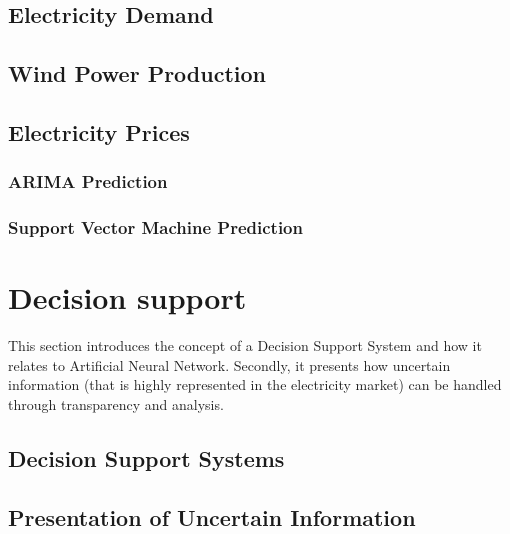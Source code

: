 \documentclass[twoside,11pt,openright]{report}
\begin{document}
\subsection{Electricity Demand}
\label{sec:ElectricityDemand}


\subsection{Wind Power Production}


\subsection{Electricity Prices}
\label{sec:electriciyPrices}


\subsubsection{ARIMA Prediction}
 
\subsubsection{Support Vector Machine Prediction}
\label{sec:svmPrediction}



\newpage

\section{Decision support}
This section introduces the concept of a Decision Support System and how it relates to Artificial Neural Network. Secondly, it presents how uncertain information (that is highly represented in the electricity market) can be handled through transparency and analysis.  
\label{sec:dssAndUncertain}
\subsection{Decision Support Systems}
\label{sec:dssSection}

\subsection{Presentation of Uncertain Information}
\label{sec:uncertainInformation}

\end{document}

